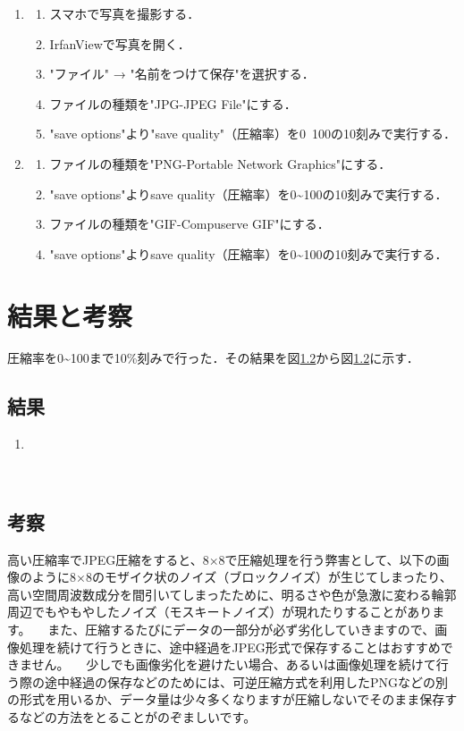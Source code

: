\documentclass[a4paper,11pt]{bxjsarticle}
\begin{document}
\begin{enumerate}
  \item \begin{enumerate}
          \item スマホで写真を撮影する．
          \item IrfanViewで写真を開く．
          \item "ファイル" → "名前をつけて保存"を選択する．
          \item ファイルの種類を"JPG-JPEG File"にする．
          \item "save options"より"save quality"（圧縮率）を0~100の10刻みで実行する．
        \end{enumerate}
  \item \begin{enumerate}
          \item ファイルの種類を"PNG-Portable Network Graphics"にする．
          \item "save options"よりsave quality（圧縮率）を0\textasciitilde100の10刻みで実行する．
          \item ファイルの種類を"GIF-Compuserve GIF"にする．
          \item "save options"よりsave quality（圧縮率）を0\textasciitilde100の10刻みで実行する．
        \end{enumerate}
\end{enumerate}



\section{結果と考察}
圧縮率を0\textasciitilde100まで10\%刻みで行った．その結果を図\ref{}から図\ref{}に示す．
  \subsection{結果}
  \begin{enumerate}
    \item 
  \end{enumerate}

  　

  \subsection{考察}
  高い圧縮率でJPEG圧縮をすると、8×8で圧縮処理を行う弊害として、以下の画像のように8×8のモザイク状のノイズ（ブロックノイズ）が生じてしまったり、高い空間周波数成分を間引いてしまったために、明るさや色が急激に変わる輪郭周辺でもやもやしたノイズ（モスキートノイズ）が現れたりすることがあります。
  　また、圧縮するたびにデータの一部分が必ず劣化していきますので、画像処理を続けて行うときに、途中経過をJPEG形式で保存することはおすすめできません。
  　少しでも画像劣化を避けたい場合、あるいは画像処理を続けて行う際の途中経過の保存などのためには、可逆圧縮方式を利用したPNGなどの別の形式を用いるか、データ量は少々多くなりますが圧縮しないでそのまま保存するなどの方法をとることがのぞましいです。
\end{document}
